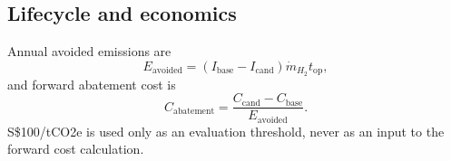 \subsection{Lifecycle and economics}
Annual avoided emissions are
\begin{equation}
E_{\mathrm{avoided}}=(I_{\mathrm{base}}-I_{\mathrm{cand}})
\dot m_{H_2}t_{\mathrm{op}},
\label{eq:annual-avoided}
\end{equation}
and forward abatement cost is
\begin{equation}
C_{\mathrm{abatement}}=
\frac{C_{\mathrm{cand}}-C_{\mathrm{base}}}
{E_{\mathrm{avoided}}}.
\label{eq:abatement-cost}
\end{equation}
S\$100/tCO2e is used only as an evaluation threshold, never as an input to the forward cost calculation.
